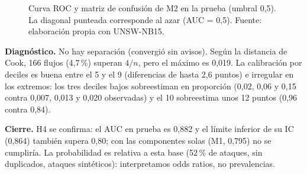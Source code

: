 \begin{figure}[htbp]
  \centering
  \caption[Curva ROC y matriz de confusión de M2]{Curva ROC y matriz de confusión de M2 en la prueba (umbral 0,5). La diagonal punteada corresponde al azar (AUC = 0,5). Fuente: elaboración propia con UNSW-NB15.}
  \label{fig:log-roc}
\end{figure}

\textbf{Diagnóstico.} No hay separación (convergió sin avisos). Según la distancia de Cook, 166 flujos (4,7\,\%) superan $4/n$, pero el máximo es 0,019. La calibración por deciles es buena entre el 5 y el 9 (diferencias de hasta 2,6 puntos) e irregular en los extremos: los tres deciles bajos sobreestiman en proporción (0,02, 0,06 y 0,15 contra 0,007, 0,013 y 0,020 observadas) y el 10 sobreestima unos 12 puntos (0,96 contra 0,84).

\textbf{Cierre.} H4 se confirma: el AUC en prueba es 0,882 y el límite inferior de su IC (0,864) también supera 0,80; con las componentes solas (M1, 0,795) no se cumpliría. La probabilidad es relativa a esta base (52\,\% de ataques, sin duplicados, ataques sintéticos): interpretamos odds ratios, no prevalencias.
